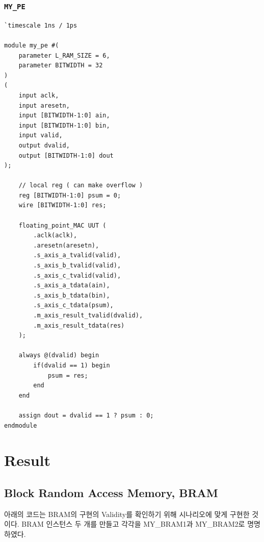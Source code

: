 \documentclass{article}
\begin{document}
\subsubsection*{\texttt{MY\_PE}}
\begin{lstlisting}[style={verilog-style}]
`timescale 1ns / 1ps

module my_pe #(
    parameter L_RAM_SIZE = 6,
    parameter BITWIDTH = 32
)
(
    input aclk,
    input aresetn,
    input [BITWIDTH-1:0] ain,
    input [BITWIDTH-1:0] bin,
    input valid,
    output dvalid,
    output [BITWIDTH-1:0] dout
);

    // local reg ( can make overflow )
    reg [BITWIDTH-1:0] psum = 0;
    wire [BITWIDTH-1:0] res;
    
    floating_point_MAC UUT (
        .aclk(aclk),
        .aresetn(aresetn),
        .s_axis_a_tvalid(valid),
        .s_axis_b_tvalid(valid),
        .s_axis_c_tvalid(valid),
        .s_axis_a_tdata(ain),
        .s_axis_b_tdata(bin),
        .s_axis_c_tdata(psum),
        .m_axis_result_tvalid(dvalid), 
        .m_axis_result_tdata(res)
    );
  
    always @(dvalid) begin
        if(dvalid == 1) begin
            psum = res;
        end
    end
    
    assign dout = dvalid == 1 ? psum : 0;
endmodule
\end{lstlisting}

\newpage
\section{Result}

\subsection{Block Random Access Memory, BRAM}
아래의 코드는 BRAM의 구현의 Validity를 확인하기 위해 시나리오에 맞게 구현한 것이다. BRAM 인스턴스 두 개를 만들고 각각을 MY\_BRAM1과 MY\_BRAM2로 명명하였다. 
\end{document}
